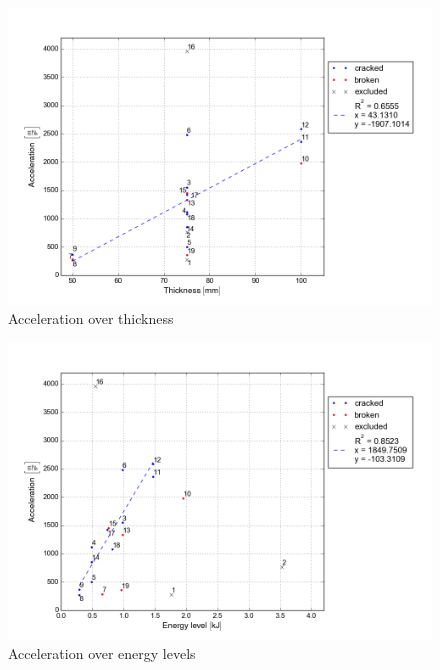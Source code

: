 \begin{figure}
    \centering
    \includegraphics[width=0.95 \linewidth]{./diagram/Acceleration_Thickness}
    \caption{Acceleration over thickness}
    \label{fig:Acceleration_Thickness}
\end{figure}



 

\begin{figure}
    \centering
    \includegraphics[width=0.95 \linewidth]{./diagram/Acceleration_Energy-level}
    \caption{Acceleration over energy levels}
    \label{fig:Acceleration_Energy-level}
\end{figure}

